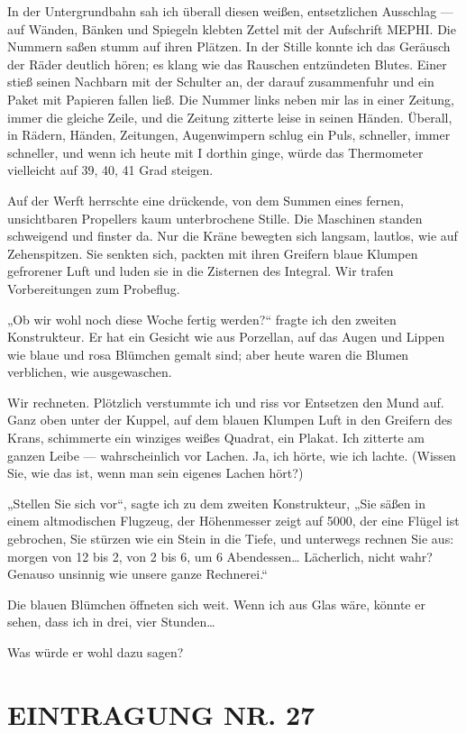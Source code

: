In der Untergrundbahn sah ich überall diesen weißen, entsetzlichen
Ausschlag — auf Wänden, Bänken und Spiegeln klebten Zettel mit der
Aufschrift MEPHI. Die Nummern saßen stumm auf ihren Plätzen. In der
Stille konnte ich das Geräusch der Räder deutlich hören; es klang
wie das Rauschen entzündeten Blutes. Einer stieß seinen Nachbarn
mit der Schulter an, der darauf zusammenfuhr und ein Paket mit
Papieren fallen ließ. Die Nummer links neben mir las in einer
Zeitung, immer die gleiche Zeile, und die Zeitung zitterte leise in
seinen Händen. Überall, in Rädern, Händen, Zeitungen, Augenwimpern
schlug ein Puls, schneller, immer schneller, und wenn ich heute mit
I dorthin ginge, würde das Thermometer vielleicht auf 39, 40, 41
Grad steigen.

Auf der Werft herrschte eine drückende, von dem Summen eines
fernen, unsichtbaren Propellers kaum unterbrochene Stille. Die
Maschinen standen schweigend und finster da. Nur die Kräne bewegten
sich langsam, lautlos, wie auf Zehenspitzen. Sie senkten sich,
packten mit ihren Greifern
blaue Klumpen gefrorener Luft und luden sie in die Zisternen des
Integral. Wir trafen Vorbereitungen zum Probeflug.

„Ob wir wohl noch diese Woche fertig werden?“ fragte ich den
zweiten Konstrukteur. Er hat ein Gesicht wie aus Porzellan, auf das
Augen und Lippen wie blaue und rosa Blümchen gemalt sind; aber
heute waren die Blumen verblichen, wie ausgewaschen.

Wir rechneten. Plötzlich verstummte ich und riss vor Entsetzen den
Mund auf. Ganz oben unter der Kuppel, auf dem blauen Klumpen Luft
in den Greifern des Krans, schimmerte ein winziges weißes Quadrat,
ein Plakat. Ich zitterte am ganzen Leibe — wahrscheinlich vor
Lachen. Ja, ich hörte, wie ich lachte. (Wissen Sie, wie das ist,
wenn man sein eigenes Lachen hört?)

„Stellen Sie sich vor“, sagte ich zu dem zweiten Konstrukteur, „Sie
säßen in einem altmodischen Flugzeug, der Höhenmesser zeigt auf
5000, der eine Flügel ist gebrochen, Sie stürzen wie ein Stein in
die Tiefe, und unterwegs rechnen Sie aus: morgen von 12 bis 2, von
2 bis 6, um 6 Abendessen\ldots{} Lächerlich, nicht wahr? Genauso
unsinnig wie unsere ganze Rechnerei.“

Die blauen Blümchen öffneten
sich weit. Wenn ich aus Glas wäre, könnte er sehen, dass ich in
drei, vier Stunden\ldots{}

Was würde er wohl dazu sagen?

\section{EINTRAGUNG NR. 27}

